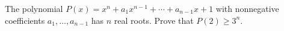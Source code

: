 The polynomial $P(x) = x^n + a_1x^{n-1} + \cdots + a_{n-1}x + 1$ with nonnegative coefficients $a_1, \ldots, a_{n-1}$ has $n$ real roots. Prove that $P(2) \geq 3^n$.
